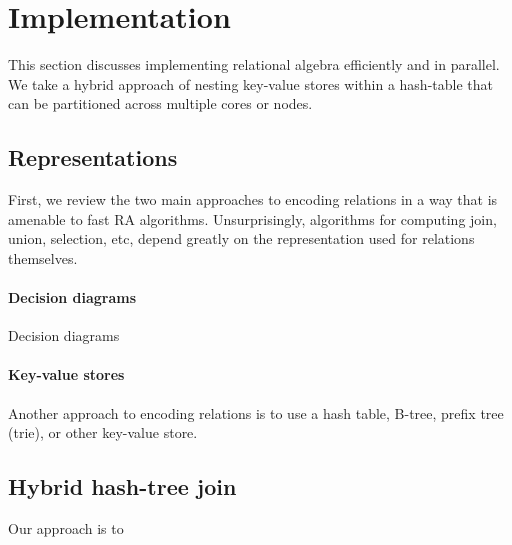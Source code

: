 

\section{Implementation}
\label{sec:impl}
%
This section discusses implementing relational algebra efficiently and in parallel. We take a hybrid approach of nesting key-value stores within a hash-table that can be partitioned across multiple cores or nodes. 


\subsection{Representations}

First, we review the two main approaches to encoding relations in a way that is amenable to fast RA algorithms. Unsurprisingly, algorithms for computing join, union, selection, etc, depend greatly on the representation used for relations themselves.

\paragraph{Decision diagrams} Decision diagrams 


\paragraph{Key-value stores} Another approach to encoding relations is to use a hash table, B-tree, prefix tree (trie), or other key-value store.


\subsection{Hybrid hash-tree join}

Our approach is to 
